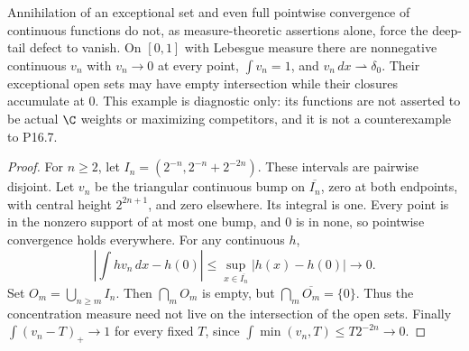 \begin{proposition}\label{fresh:diagnostic}
Annihilation of an exceptional set and even full pointwise convergence
of continuous functions do not, as measure-theoretic assertions alone,
force the deep-tail defect to vanish. On $[0,1]$ with Lebesgue measure
there are nonnegative continuous $v_n$ with $v_n\to0$ at every point,
$\int v_n=1$, and $v_n\,dx\rightharpoonup\delta_0$.
Their exceptional open sets may have empty intersection while their
closures accumulate at $0$. This example is diagnostic only: its
functions are not asserted to be actual $\C$ weights or maximizing
competitors, and it is not a counterexample to P16.7.
\end{proposition}
\begin{proof}
For $n\ge2$, let $I_n=(2^{-n},2^{-n}+2^{-2n})$. These intervals are
pairwise disjoint. Let $v_n$ be the triangular continuous bump on
$\overline{I_n}$, zero at both endpoints, with central height
$2^{2n+1}$, and zero elsewhere. Its integral is one. Every point is
in the nonzero support of at most one bump, and $0$ is in none, so
pointwise convergence holds everywhere. For any continuous $h$,
\[
 \left|\int h v_n\,dx-h(0)\right|
 \le\sup_{x\in\overline{I_n}}|h(x)-h(0)|\to0.
\]
Set $O_m=\bigcup_{n\ge m}I_n$. Then $\bigcap_m O_m$ is empty,
but $\bigcap_m\overline{O_m}=\{0\}$. Thus the concentration
measure need not live on the intersection of the open sets. Finally
$\int(v_n-T)_+\to1$ for every fixed $T$, since
$\int\min(v_n,T)\le T2^{-2n}\to0$.
\end{proof}

